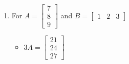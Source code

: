 \begin{enumerate}
\begin{multicols}{3}
\begin{itemize}
\item  $3A = \left[ \begin{array}{rr} 6 & 12 \\ 18 & 24 \end{array} \right]$

\item $-B = \left[ \begin{array}{rrr} 1 & -3 & 5 \\ -7 & 9 & -11 \end{array} \right]$

\item $A^2 = \left[ \begin{array}{rr} 28 & 40 \\ 60 & 88 \end{array} \right]$

\end{itemize}
\end{multicols}


\begin{multicols}{3}
\begin{itemize}
\item  $A-2B$ is not defined

\item $AB = \left[ \begin{array}{rrr} 26 & -30 & 34 \\ 50 & -54 & 58 \end{array} \right]$

\item $BA$ is not defined

\end{itemize}
\end{multicols}

\pagebreak

\item For $A = \left[ \begin{array}{r} 7 \\ 8 \\ 9 \end{array} \right]$ and $B=\left[ \begin{array}{rrr} 1 & 2 & 3 \end{array} \right]$

\begin{multicols}{2}
\begin{itemize}
\item  $3A = \left[ \begin{array}{r} 21 \\ 24 \\ 27 \end{array} \right]$


\end{itemize}
\end{multicols}
\end{enumerate}
